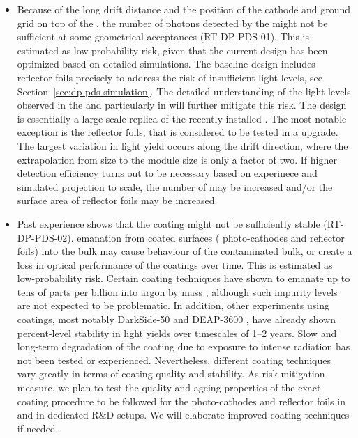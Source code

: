 \begin{itemize}

\item Because of the long drift distance and the position of the cathode and ground grid on top of the , the number of photons detected by the  might not be sufficient at some geometrical acceptances (RT-DP-PDS-01). This is estimated as low-probability risk, given that the current  design has been optimized based on detailed simulations. The  baseline design includes  reflector foils precisely to address the risk of insufficient light levels, see Section~\ref{sec:dp-pds-simulation}. The detailed understanding of the light levels observed in the  and particularly in  will further mitigate this risk. The \dune {}  design is essentially a large-scale replica of the recently installed  . The most notable exception is the  reflector foils, that is considered to be tested in a   upgrade. The largest variation in light yield occurs along the drift direction, where the extrapolation from  size to the \dune {} module size is only a factor of two. If higher  detection efficiency turns out to be necessary based on  experinece and simulated projection to \dune scale, the number of  may be increased and/or the surface area of  reflector foils may be increased.

\item Past experience shows that the  coating might not be sufficiently stable (RT-DP-PDS-02).  emanation from coated surfaces ( photo-cathodes and  reflector foils) into the bulk  may cause  behaviour of the contaminated  bulk, or create a loss in optical performance of the coatings over time. This is estimated as low-probability risk. Certain coating techniques have shown to emanate  up to tens of parts per billion into argon by mass \cite{Asaadi:2018ixs}, although such impurity levels are not expected to be problematic. In addition, other  experiments using  coatings, most notably DarkSide-50 \cite{Agnes:2018fwg} and DEAP-3600 \cite{Ajaj:2019imk}, have already shown percent-level stability in  light yields over timescales of 1--2 years. Slow and long-term degradation of the  coating due to exposure to intense  radiation has not been tested or experienced. Nevertheless, different coating techniques vary greatly in terms of coating quality and stability. As risk mitigation measure, we plan to test the quality and ageing properties of the exact coating procedure to be followed for the  photo-cathodes and  reflector foils in  and in dedicated R\&D setups. We will elaborate improved coating techniques if needed.


\end{itemize}
